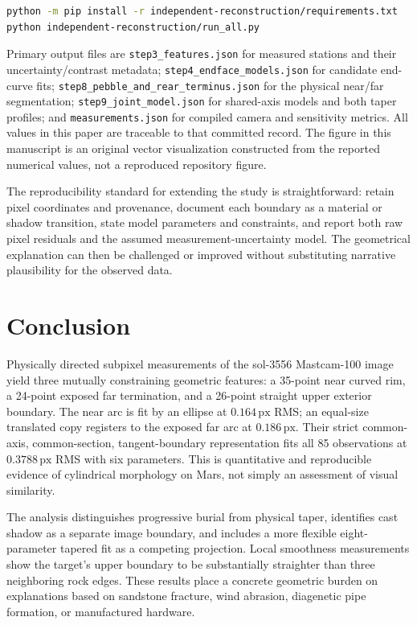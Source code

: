 \documentclass[11pt,letterpaper]{article}
\newcommand{\px}{\,\mathrm{px}}
\newcommand{\sourcepath}[1]{\nolinkurl{#1}}
\begin{document}
\begin{lstlisting}[language=bash,caption={Re-execution from a local repository checkout containing the PDS image data.}]
python -m pip install -r independent-reconstruction/requirements.txt
python independent-reconstruction/run_all.py
\end{lstlisting}

Primary output files are \sourcepath{step3_features.json} for measured stations and their uncertainty/contrast metadata; \sourcepath{step4_endface_models.json} for candidate end-curve fits; \sourcepath{step8_pebble_and_rear_terminus.json} for the physical near/far segmentation; \sourcepath{step9_joint_model.json} for shared-axis models and both taper profiles; and \sourcepath{measurements.json} for compiled camera and sensitivity metrics. All values in this paper are traceable to that committed record. The figure in this manuscript is an original vector visualization constructed from the reported numerical values, not a reproduced repository figure.

The reproducibility standard for extending the study is straightforward: retain pixel coordinates and provenance, document each boundary as a material or shadow transition, state model parameters and constraints, and report both raw pixel residuals and the assumed measurement-uncertainty model. The geometrical explanation can then be challenged or improved without substituting narrative plausibility for the observed data.

\section{Conclusion}

Physically directed subpixel measurements of the sol-3556 Mastcam-100 image yield three mutually constraining geometric features: a 35-point near curved rim, a 24-point exposed far termination, and a 26-point straight upper exterior boundary. The near arc is fit by an ellipse at \(0.164\px\) RMS; an equal-size translated copy registers to the exposed far arc at \(0.186\px\). Their strict common-axis, common-section, tangent-boundary representation fits all 85 observations at \(0.3788\px\) RMS with six parameters. This is quantitative and reproducible evidence of cylindrical morphology on Mars, not simply an assessment of visual similarity.

The analysis distinguishes progressive burial from physical taper, identifies cast shadow as a separate image boundary, and includes a more flexible eight-parameter tapered fit as a competing projection. Local smoothness measurements show the target's upper boundary to be substantially straighter than three neighboring rock edges. These results place a concrete geometric burden on explanations based on sandstone fracture, wind abrasion, diagenetic pipe formation, or manufactured hardware.
\end{document}

